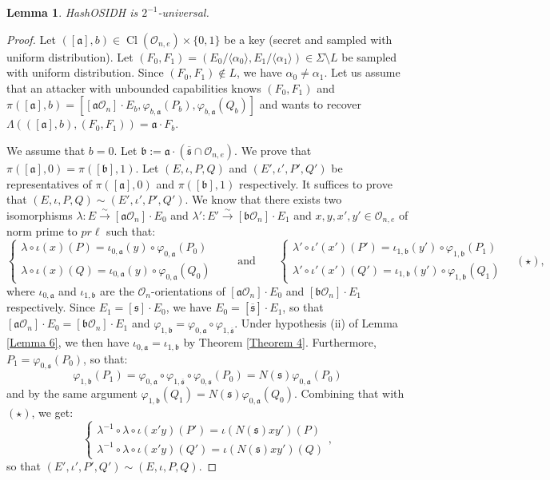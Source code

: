 \documentclass[a4paper,10pt]{report}
\theoremstyle{definition}
\theoremstyle{plain}
\newtheorem{Lemma}[Definition]{Lemma}
\theoremstyle{definition}
\newcommand{\mO}{\mathcal{O}}
\renewcommand{\(}{\left(}
\renewcommand{\)}{\right)}
\newcommand{\mf}[1]{\mathfrak{#1}}
\DeclareMathOperator{\Cl}{Cl}
\begin{document}
\begin{Lemma}
HashOSIDH is $2^{-1}$-universal.
\end{Lemma}

\begin{proof}
Let $([\mf{a}],b)\in \Cl(\mO_{n,e})\times\{0,1\}$ be a key (secret and sampled with uniform distribution). Let $(F_0,F_1)=(E_0/\langle\alpha_0\rangle, E_1/\langle\alpha_1\rangle)\in \Sigma\setminus L$ be sampled with uniform distribution.  Since $(F_0,F_1)\not\in L$, we have $\alpha_0\neq\alpha_1$. Let us assume that an attacker with unbounded capabilities knows $(F_0,F_1)$ and $\pi([\mf{a}],b)=[[\mf{a}\mO_n]\cdot E_b, \varphi_{b,\mf{a}}(P_b),\varphi_{b,\mf{a}}(Q_b)]$ and wants to recover $\Lambda(([\mf{a}],b),(F_0,F_1))=\mf{a}\cdot F_b$.  

We assume that $b=0$. Let $\mf{b}:=\mf{a}\cdot (\overline{\mf{s}}\cap\mO_{n,e})$. We prove that $\pi([\mf{a}],0)=\pi([\mf{b}],1)$. Let $(E,\iota, P,Q)$ and $(E',\iota',P',Q')$ be representatives of $\pi([\mf{a}],0)$ and $\pi([\mf{b}],1)$ respectively. It suffices to prove that $(E,\iota, P,Q)\sim(E',\iota',P',Q')$.  We know that there exists two isomorphisms $\lambda : E\overset{\sim}{\longrightarrow} [\mf{a}\mO_n]\cdot E_0$ and $\lambda' : E'\overset{\sim}{\longrightarrow} [\mf{b}\mO_n]\cdot E_1$ and $x, y, x',y'\in\mO_{n,e}$ of norm prime to $pr\ell$ such that:
\[\left\{\begin{array}{c}
\lambda\circ\iota(x)(P)=\iota_{0,\mf{a}}(y)\circ\varphi_{0,\mf{a}}(P_0)\\
\lambda\circ\iota(x)(Q)=\iota_{0,\mf{a}}(y)\circ\varphi_{0,\mf{a}}(Q_0)
\end{array}\right.\qquad \mbox{and}\qquad \left\{\begin{array}{c}
\lambda'\circ\iota'(x')(P')=\iota_{1,\mf{b}}(y')\circ\varphi_{1,\mf{b}}(P_1)\\
\lambda'\circ\iota'(x')(Q')=\iota_{1,\mf{b}}(y')\circ\varphi_{1,\mf{b}}(Q_1)
\end{array}\right.\quad (\star),\]
where $\iota_{0,\mf{a}}$ and $\iota_{1,\mf{b}}$ are the $\mO_n$-orientations of $[\mf{a}\mO_n]\cdot E_0$ and $[\mf{b}\mO_n]\cdot E_1$ respectively. Since $E_1=[\mf{s}]\cdot E_0$, we have $E_0=[\overline{\mf{s}}]\cdot E_1$, so that $[\mf{a}\mO_n]\cdot E_0=[\mf{b}\mO_n]\cdot E_1$ and $\varphi_{1,\mf{b}}=\varphi_{0,\mf{a}}\circ\varphi_{1,\overline{\mf{s}}}$.  Under hypothesis (ii) of Lemma \ref{Lemma 6}, we then have $\iota_{0,\mf{a}}=\iota_{1,\mf{b}}$ by Theorem \ref{Theorem 4}.  Furthermore, $P_1=\varphi_{0,\mf{s}}(P_0)$, so that:
\[\varphi_{1,\mf{b}}(P_1)=\varphi_{0,\mf{a}}\circ\varphi_{1,\overline{\mf{s}}}\circ\varphi_{0,\mf{s}}(P_0)=N(\mf{s})\varphi_{0,\mf{a}}(P_0)\]
and by the same argument $\varphi_{1,\mf{b}}(Q_1)=N(\mf{s})\varphi_{0,\mf{a}}(Q_0)$.  Combining that with $(\star)$, we get:
\[\left\{\begin{array}{c}
\lambda^{-1}\circ\lambda\circ\iota(x'y)(P')=\iota(N(\mf{s})xy')(P)\\
\lambda^{-1}\circ\lambda\circ\iota(x'y)(Q')=\iota(N(\mf{s})xy')(Q)
\end{array}\right.,\]
so that $(E',\iota',P',Q')\sim (E,\iota, P,Q)$.


\end{proof}
\end{document}
